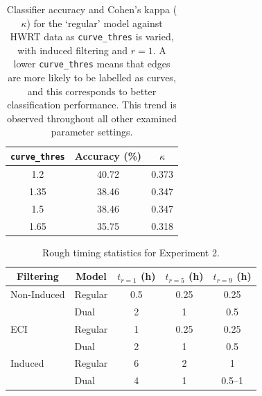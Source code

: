 \documentclass{mpaper}
\begin{document}
\begin{table}
	\centering
	
	\begin{tabular}{ccc}
		\toprule
		\texttt{curve\_thres} & Accuracy (\si{\percent}) & $\kappa$ \\
		\midrule
		1.2 & 40.72 & 0.373 \\
		1.35 & 38.46 & 0.347 \\
		1.5 & 38.46 & 0.347 \\
		1.65 & 35.75 & 0.318 \\
		\bottomrule
	\end{tabular}
	
	\vspace{0.5em}
	\caption{
		Classifier accuracy and Cohen's kappa ($\kappa$) for the `regular' model against HWRT data as \texttt{curve\_thres} is varied, with induced filtering and $r=1$.
		A lower \texttt{curve\_thres} means that edges are more likely to be labelled as curves, and this corresponds to better classification performance.
		This trend is observed throughout all other examined parameter settings.
		\label{tab:exp2-thres}
	}
\end{table}

%	
%	

\begin{table}

\centering
\begin{tabular}{llccc}
	\toprule
	\multicolumn{1}{c}{Filtering} & \multicolumn{1}{c}{Model} & $t_{r=1}$ (\si{\hour}) & $t_{r=5}$ (\si{\hour}) & $t_{r=9}$ (\si{\hour}) \\
	\midrule
	
	Non-Induced & Regular & 0.5 & 0.25 & 0.25 \\
	& Dual & 2 & 1 & 0.5 \\
	
	ECI & Regular & 1 & 0.25 & 0.25 \\
	& Dual & 2 & 1 & 0.5 \\
	
	Induced & Regular & 6 & 2 & 1 \\
	& Dual & 4 & 1 & 0.5--1 \\
	
	\bottomrule
\end{tabular}
	
\vspace{0.5em}
\caption{
	Rough timing statistics for Experiment 2.
	\label{tab:ex2-times}
}
\end{table}
\end{document}
